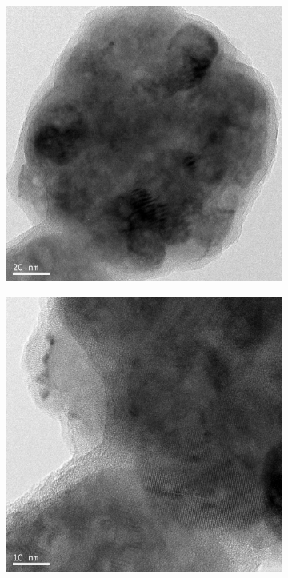 \documentclass[12pt,a4paper]{article}
\begin{document}
\begin{figure}[htbp]
  \centering
  
  \begin{subfigure}[b]{0.45\textwidth}
    \includegraphics[width=\textwidth]{Data/Fe3O4-SiO2-0001.png}
  \end{subfigure}%
  \begin{subfigure}[b]{0.45\textwidth}
    \includegraphics[width=\textwidth]{Data/Fe3O4-SiO2-0002.png}
  \end{subfigure}
  

\end{figure}
\end{document}
